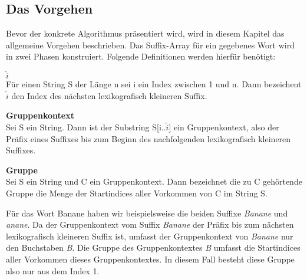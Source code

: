 \newpage
\subsection{Das Vorgehen}
\label{gsaca:chapter2}
%
Bevor der konkrete Algorithmus präsentiert  wird, wird in diesem Kapitel das allgemeine Vorgehen beschrieben. 
Das Suffix-Array für ein gegebenes Wort wird in zwei Phasen konstruiert.
Folgende Definitionen werden hierfür benötigt:

\begin{definition}\textbf{$\widehat{i}$}\\
Für einen String S der Länge n sei i ein Index zwischen 1 und n. Dann bezeichent $\widehat{i}$ den Index des nächsten lexikografisch kleineren Suffix.
\end{definition}

\begin{definition}\textbf{Gruppenkontext}\\
Sei S ein String. Dann ist der Substring S[i..$\widehat{i}$] ein Gruppenkontext, also der Präfix eines Suffixes bis zum Beginn des nachfolgenden lexikografisch kleineren Suffixes.
\end{definition}

\begin{definition}\textbf{Gruppe}\\
Sei S ein String und C ein Gruppenkontext. Dann bezeichnet die zu C gehörtende Gruppe die Menge der Startindices aller Vorkommen von C im String S.
\end{definition}

Für das Wort Banane haben wir beispielsweise die beiden Suffixe \textit{Banane} und \textit{anane}.  
Da der Gruppenkontext vom Suffix \textit{Banane} der Präfix bis zum nächsten lexikografisch kleineren Suffix ist, umfasst der Gruppenkontext von \textit{Banane} nur den Buchstaben \textit{B}. 
Die Gruppe des Gruppenkontextes \textit{B} umfasst die Startindices aller Vorkommen dieses Gruppenkontextes.
In diesem Fall besteht diese Gruppe also nur aus dem Index 1.

